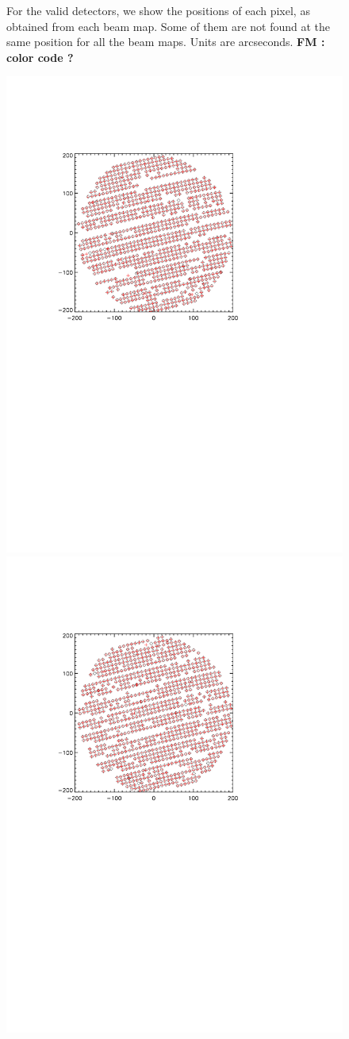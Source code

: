 \begin{figure}[htp]
\begin{center}
\caption{For the valid detectors, we show the positions of each pixel, as obtained from 
each beam map. Some of them are not found at the 
same position for all the beam maps. Units are arcseconds. {\bf FM : color code ?}}
\label{fig:jumping_kids}
\end{center}
\end{figure}

\begin{figure}[htp]
\begin{center}
\includegraphics[trim=2cm 14cm 5cm 4cm, clip=true,width=0.55\linewidth]{Figures/A1_test_positions.pdf}
\includegraphics[trim=2cm 14cm 5cm 4cm, clip=true,width=0.55\linewidth]{Figures/A3_test_positions.pdf}

\end{center}
\end{figure}
